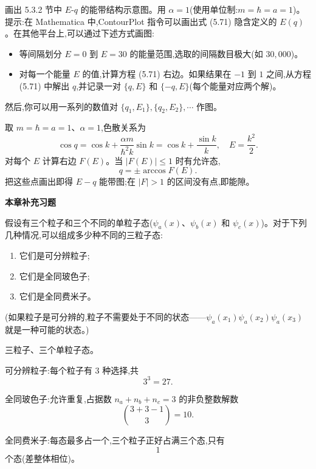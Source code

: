 \begin{question}
画出 5.3.2 节中 $E$-$q$ 的能带结构示意图。用 $\alpha=1$(使用单位制:$m=\hbar=a=1$)。提示:在 Mathematica 中,ContourPlot 指令可以画出式 (5.71) 隐含定义的 $E(q)$。在其他平台上,可以通过下述方式画图:
\begin{itemize}
\item 等间隔划分 $E=0$ 到 $E=30$ 的能量范围,选取的间隔数目极大(如 $30{,}000$)。
\item 对每一个能量 $E$ 的值,计算方程 (5.71) 右边。如果结果在 $-1$ 到 $1$ 之间,从方程 (5.71) 中解出 $q$,并记录一对 $\{q,E\}$ 和 $\{-q,E\}$(每个能量对应两个解)。
\end{itemize}
然后,你可以用一系列的数值对 $\{q_1,E_1\},\{q_2,E_2\},\cdots$ 作图。

\par\smallskip
{}

\end{question}
\begin{solution}

取 $m=\hbar=a=1$、$\alpha=1$,色散关系为
\[
\cos q=\cos k+\frac{\alpha m}{\hbar^2 k}\sin k
=\cos k+\frac{\sin k}{k},
\quad E=\frac{k^2}{2}.
\]
对每个 $E$ 计算右边 $F(E)$。当 $|F(E)|\le1$ 时有允许态,
\[
q=\pm\arccos F(E).
\]
把这些点画出即得 $E-q$ 能带图;在 $|F|>1$ 的区间没有点,即能隙。

\end{solution}

\begin{center}\Large\bfseries 本章补充习题\end{center}

\begin{question}
假设有三个粒子和三个不同的单粒子态($\psi_a(x)$、$\psi_b(x)$ 和 $\psi_c(x)$)。对于下列几种情况,可以组成多少种不同的三粒子态:
\begin{enumerate}
\item 它们是可分辨粒子;
\item 它们是全同玻色子;
\item 它们是全同费米子。
\end{enumerate}
(如果粒子是可分辨的,粒子不需要处于不同的状态——$\psi_a(x_1)\psi_a(x_2)\psi_a(x_3)$ 就是一种可能的状态。)
\end{question}
\begin{solution}

三粒子、三个单粒子态。

可分辨粒子:每个粒子有 3 种选择,共
\[
3^3=27.
\]

全同玻色子:允许重复,占据数 $n_a+n_b+n_c=3$ 的非负整数解数
\[
\binom{3+3-1}{3}=10.
\]

全同费米子:每态最多占一个,三个粒子正好占满三个态,只有
\[
1
\]
个态(差整体相位)。

\end{solution}

